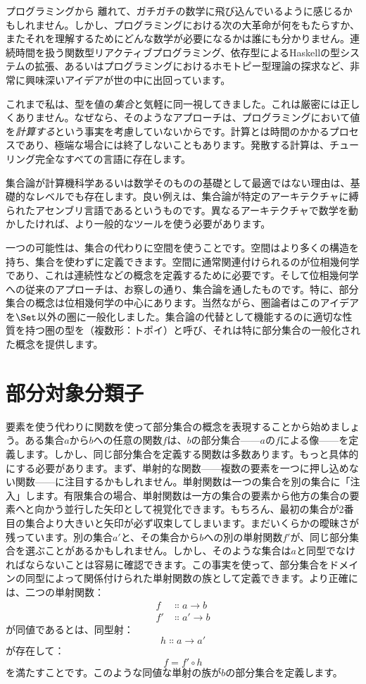 
\lettrine[lhang=0.17]{プ}{ログラミングから} 離れて、ガチガチの数学に飛び込んでいるように感じるかもしれません。しかし、プログラミングにおける次の大革命が何をもたらすか、またそれを理解するためにどんな数学が必要になるかは誰にも分かりません。連続時間を扱う関数型リアクティブプログラミング、依存型によるHaskellの型システムの拡張、あるいはプログラミングにおけるホモトピー型理論の探求など、非常に興味深いアイデアが世の中に出回っています。

これまで私は、型を値の\emph{集合}と気軽に同一視してきました。これは厳密には正しくありません。なぜなら、そのようなアプローチは、プログラミングにおいて値を\emph{計算する}という事実を考慮していないからです。計算とは時間のかかるプロセスであり、極端な場合には終了しないこともあります。発散する計算は、チューリング完全なすべての言語に存在します。

集合論が計算機科学あるいは数学そのものの基礎として最適ではない理由は、基礎的なレベルでも存在します。良い例えは、集合論が特定のアーキテクチャに縛られたアセンブリ言語であるというものです。異なるアーキテクチャで数学を動かしたければ、より一般的なツールを使う必要があります。

一つの可能性は、集合の代わりに空間を使うことです。空間はより多くの構造を持ち、集合を使わずに定義できます。空間に通常関連付けられるのが位相幾何学であり、これは連続性などの概念を定義するために必要です。そして位相幾何学への従来のアプローチは、お察しの通り、集合論を通したものです。特に、部分集合の概念は位相幾何学の中心にあります。当然ながら、圏論者はこのアイデアを$\Set$以外の圏に一般化しました。集合論の代替として機能するのに適切な性質を持つ圏の型を（複数形：トポイ）と呼び、それは特に部分集合の一般化された概念を提供します。

\section{部分対象分類子}

要素を使う代わりに関数を使って部分集合の概念を表現することから始めましょう。ある集合$a$から$b$への任意の関数$f$は、$b$の部分集合——$a$の$f$による像——を定義します。しかし、同じ部分集合を定義する関数は多数あります。もっと具体的にする必要があります。まず、単射的な関数——複数の要素を一つに押し込めない関数——に注目するかもしれません。単射関数は一つの集合を別の集合に「注入」します。有限集合の場合、単射関数は一方の集合の要素から他方の集合の要素へと向かう並行した矢印として視覚化できます。もちろん、最初の集合が2番目の集合より大きいと矢印が必ず収束してしまいます。まだいくらかの曖昧さが残っています。別の集合$a'$と、その集合から$b$への別の単射関数$f'$が、同じ部分集合を選ぶことがあるかもしれません。しかし、そのような集合は$a$と同型でなければならないことは容易に確認できます。この事実を使って、部分集合をドメインの同型によって関係付けられた単射関数の族として定義できます。より正確には、二つの単射関数：
\begin{align*}
  f  & \Colon a \to b  \\
  f' & \Colon a' \to b
\end{align*}
が同値であるとは、同型射：
\[h \Colon a \to a'\]
が存在して：
\[f = f' \circ h\]
を満たすことです。このような同値な単射の族が$b$の部分集合を定義します。

